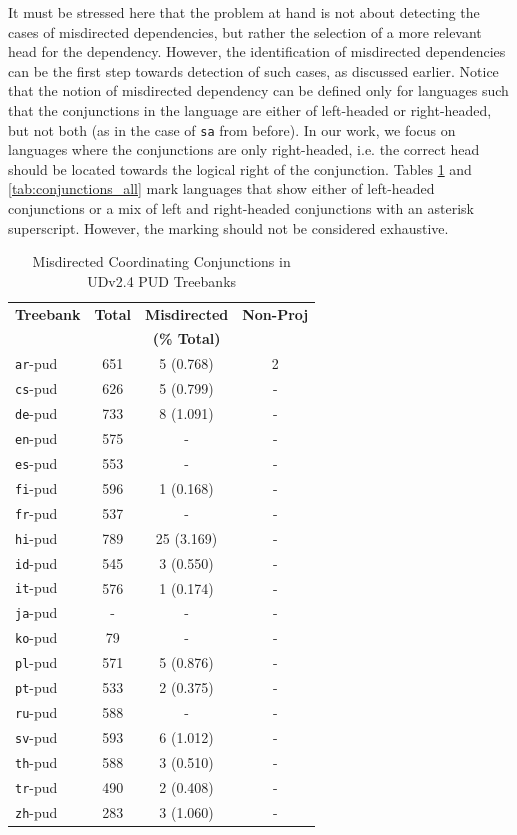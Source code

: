It must be stressed here that the problem at hand is not about detecting the cases of misdirected dependencies, but rather the selection of a more relevant head for the dependency. However, the identification of misdirected dependencies can be the first step towards detection of such cases, as discussed earlier. Notice that the notion of misdirected dependency can be defined only for languages such that the conjunctions in the language are either of left-headed or right-headed, but not both (as in the case of \verb|sa| from before). In our work, we focus on languages where the conjunctions are only right-headed, i.e. the correct head should be located towards the logical right of the conjunction. Tables \ref{tab:conjunctions_pud} and \ref{tab:conjunctions_all} mark languages that show either of left-headed conjunctions or a mix of left and right-headed conjunctions with an asterisk superscript. However, the marking should not be considered exhaustive.

\begin{table}[h]
\centering
\begin{tabular}{|l|c|c|c|}
\hline
\textbf{Treebank} & \textbf{Total} & \textbf{Misdirected} & \textbf{Non-Proj}\\
 & & \textbf{(\% Total)} & \\
\hline
\texttt{ar}-pud & 651 & 5 (0.768) & 2\\
\texttt{cs}-pud & 626 & 5 (0.799) & -\\
\texttt{de}-pud & 733 & 8 (1.091) & -\\
\texttt{en}-pud & 575 & - & -\\
\texttt{es}-pud & 553 & - & -\\
\texttt{fi}-pud & 596 & 1 (0.168) & -\\
\texttt{fr}-pud & 537 & - & -\\
\texttt{hi}-pud & 789 & 25 (3.169) & -\\
\texttt{id}-pud & 545 & 3 (0.550) & -\\
\texttt{it}-pud & 576 & 1 (0.174) & -\\
\texttt{ja}-pud & - & - & -\\
\texttt{ko}-pud & 79 & - & -\\
\texttt{pl}-pud & 571 & 5 (0.876) & -\\
\texttt{pt}-pud & 533 & 2 (0.375) & -\\
\texttt{ru}-pud & 588 & - & -\\
\texttt{sv}-pud & 593 & 6 (1.012) & -\\
\texttt{th}-pud & 588 & 3 (0.510) & -\\
\texttt{tr}-pud & 490 & 2 (0.408) & -\\
\texttt{zh}-pud & 283 & 3 (1.060) & -\\
\hline
\end{tabular}
\caption{Misdirected Coordinating Conjunctions in UDv2.4 PUD Treebanks}
\label{tab:conjunctions_pud}
\end{table}

